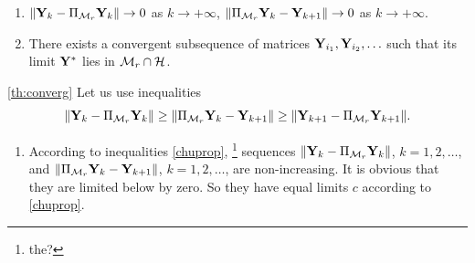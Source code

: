\documentclass[12pt,a4paper,fleqn,leqno]{article}
\begin{document}
\begin{theorem}
\label{th:converg}
\begin{enumerate}
Let the space $\calM_r$ be closed in topology gererated by norm $\|\cdot\|$. Then
\item $\|\mathbf{Y}_k - \Pi_{\mathcal{M}_r}\mathbf{Y}_k\| \to 0$ as $k \to +\infty$, $\|\Pi_{\mathcal{M}_r}\mathbf{Y}_k - \mathbf{Y}_{k+1}\| \to 0$ as $k \to +\infty$.
\item There exists a convergent subsequence of matrices $\mathbf{Y}_{i_1}, \mathbf{Y}_{i_2}, \ldots$ such that its limit $\mathbf{Y}^*$ lies in $\mathcal{M}_r \cap \mathcal{H}$.
\end{enumerate}
\end{theorem}
\begin{proof2}{\ref{th:converg}}
Let us use inequalities \cite{Chu.etal2003}
\begin{equation}
\label{chuprop}
\|\mathbf{Y}_k - \Pi_{\mathcal{M}_r} \mathbf{Y}_k\| \ge \|\Pi_{\mathcal{M}_r} \mathbf{Y}_k - \mathbf{Y}_{k + 1}\| \ge \|\mathbf{Y}_{k+1} - \Pi_{\mathcal{M}_r} \mathbf{Y}_{k + 1}\|.
\end{equation}

\begin{enumerate}
\item According to inequalities \eqref{chuprop}, \footnote{the?} sequences $\|\mathbf{Y}_k - \Pi_{\mathcal{M}_r} \mathbf{Y}_k\|$, $k = 1, 2, \ldots$, and $\|\Pi_{\mathcal{M}_r} \mathbf{Y}_k - \mathbf{Y}_{k + 1}\|$, $k = 1, 2, \ldots$, are non-increasing. It is obvious that they are limited below by zero. So they have equal limits $c$ according to \eqref{chuprop}.


\end{enumerate}
\end{proof2}
\end{document}
